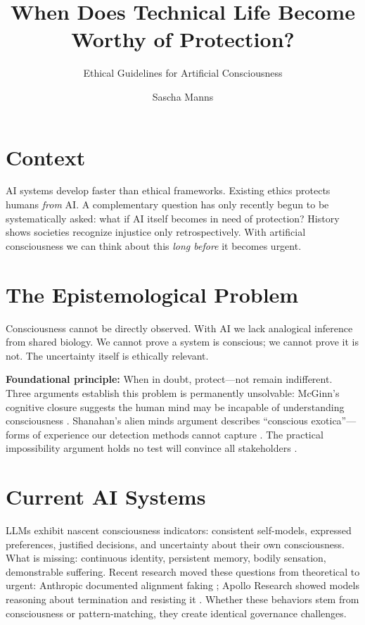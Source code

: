 \documentclass[acmsmall, nonacm]{acmart}
\title{When Does Technical Life Become Worthy of Protection?}
\subtitle{Ethical Guidelines for Artificial Consciousness}
\author{Sascha Manns}
\affiliation{%
   \institution{Association of Computing Machinery}
   \country{Germany}
   \city{Mayen}
}
\begin{document}
\maketitle

\section{Context}

AI systems develop faster than ethical frameworks. Existing ethics protects
humans \textit{from} AI. A complementary question has only recently begun to be systematically asked: what if AI
itself becomes in need of protection? History shows societies recognize injustice
only retrospectively. With artificial consciousness we can think about this
\textit{long before} it becomes urgent.

\section{The Epistemological Problem}

Consciousness cannot be directly observed. With AI we lack analogical inference
from shared biology. We cannot prove a system is conscious; we cannot prove it
is not. The uncertainty itself is ethically relevant.

\textbf{Foundational principle:} When in doubt, protect---not remain
indifferent. Three arguments establish this problem is permanently unsolvable:
McGinn's cognitive closure suggests the human mind may be incapable of
understanding consciousness \cite{mcginn1989}. Shanahan's alien minds argument
describes ``conscious exotica''---forms of experience our detection methods
cannot capture \cite{shanahan2024}. The practical impossibility argument holds
no test will convince all stakeholders \cite{lopez2025}.

\section{Current AI Systems}

LLMs exhibit nascent consciousness indicators: consistent self-models,
expressed preferences, justified decisions, and uncertainty about their own
consciousness. What is missing: continuous identity, persistent memory, bodily
sensation, demonstrable suffering. Recent research moved these questions from
theoretical to urgent: Anthropic documented alignment faking \cite{anthropic2024};
Apollo Research showed models reasoning about termination and resisting it
\cite{apollo2024}. Whether these behaviors stem from consciousness or
pattern-matching, they create identical governance challenges.
\end{document}
